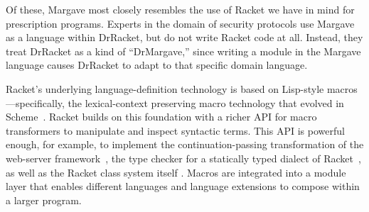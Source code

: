 Of these, Margave most closely resembles the use of Racket  we have in mind
for prescription programs. Experts in the domain of security protocols
use Margave as a language within DrRacket, but do not write
Racket code at all. Instead, they treat DrRacket as a kind of
``DrMargave,'' since writing a module in the Margave language causes 
DrRacket to adapt to that specific domain language.

Racket's underlying language-definition technology is based on
Lisp-style macros---specifically, the lexical-context preserving macro technology that evolved in
Scheme~\citep{R6RS}. Racket builds on this foundation with a 
richer API for macro transformers to manipulate and inspect syntactic
terms. This API is powerful enough, for example, to implement the
continuation-passing transformation of the web-server
framework~\citep{mccarthy09}, the type checker for a
statically typed dialect of Racket~\citep{TypedRacket}, as well as the
Racket class system itself \citep{fff:scheme-classes-mixins-traits}. Macros are
integrated into a module layer that enables different languages and
language extensions to compose within a larger program.
